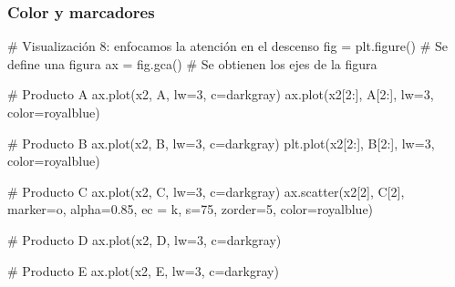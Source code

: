 \documentclass[
  letterpaper,
  DIV=11,
  numbers=noendperiod]{scrreprt}
\newenvironment{Shaded}{\begin{snugshade}}{\end{snugshade}}
\newcommand{\CommentTok}[1]{\textcolor[rgb]{0.37,0.37,0.37}{#1}}
\newcommand{\DecValTok}[1]{\textcolor[rgb]{0.68,0.00,0.00}{#1}}
\newcommand{\FloatTok}[1]{\textcolor[rgb]{0.68,0.00,0.00}{#1}}
\newcommand{\NormalTok}[1]{\textcolor[rgb]{0.00,0.23,0.31}{#1}}
\newcommand{\OperatorTok}[1]{\textcolor[rgb]{0.37,0.37,0.37}{#1}}
\newcommand{\StringTok}[1]{\textcolor[rgb]{0.13,0.47,0.30}{#1}}
\begin{document}
\subsubsection{Color y marcadores}\label{color-y-marcadores}

\begin{Shaded}
\begin{Highlighting}[]
\CommentTok{\# Visualización 8: enfocamos la atención en el descenso}
\NormalTok{fig }\OperatorTok{=}\NormalTok{ plt.figure() }\CommentTok{\# Se define una figura}
\NormalTok{ax }\OperatorTok{=}\NormalTok{ fig.gca()     }\CommentTok{\# Se obtienen los ejes de la figura}

\CommentTok{\# Producto A}
\NormalTok{ax.plot(x2, A, lw}\OperatorTok{=}\DecValTok{3}\NormalTok{, c}\OperatorTok{=}\StringTok{\textquotesingle{}darkgray\textquotesingle{}}\NormalTok{)}
\NormalTok{ax.plot(x2[}\DecValTok{2}\NormalTok{:], A[}\DecValTok{2}\NormalTok{:], lw}\OperatorTok{=}\DecValTok{3}\NormalTok{, color}\OperatorTok{=}\StringTok{\textquotesingle{}royalblue\textquotesingle{}}\NormalTok{)}

\CommentTok{\# Producto B}
\NormalTok{ax.plot(x2, B, lw}\OperatorTok{=}\DecValTok{3}\NormalTok{, c}\OperatorTok{=}\StringTok{\textquotesingle{}darkgray\textquotesingle{}}\NormalTok{)}
\NormalTok{plt.plot(x2[}\DecValTok{2}\NormalTok{:], B[}\DecValTok{2}\NormalTok{:], lw}\OperatorTok{=}\DecValTok{3}\NormalTok{, color}\OperatorTok{=}\StringTok{\textquotesingle{}royalblue\textquotesingle{}}\NormalTok{)}

\CommentTok{\# Producto C}
\NormalTok{ax.plot(x2, C, lw}\OperatorTok{=}\DecValTok{3}\NormalTok{, c}\OperatorTok{=}\StringTok{\textquotesingle{}darkgray\textquotesingle{}}\NormalTok{)}
\NormalTok{ax.scatter(x2[}\DecValTok{2}\NormalTok{], C[}\DecValTok{2}\NormalTok{], marker}\OperatorTok{=}\StringTok{\textquotesingle{}o\textquotesingle{}}\NormalTok{, alpha}\OperatorTok{=}\FloatTok{0.85}\NormalTok{, ec }\OperatorTok{=} \StringTok{\textquotesingle{}k\textquotesingle{}}\NormalTok{, s}\OperatorTok{=}\DecValTok{75}\NormalTok{, zorder}\OperatorTok{=}\DecValTok{5}\NormalTok{, color}\OperatorTok{=}\StringTok{\textquotesingle{}royalblue\textquotesingle{}}\NormalTok{)}

\CommentTok{\# Producto D}
\NormalTok{ax.plot(x2, D, lw}\OperatorTok{=}\DecValTok{3}\NormalTok{, c}\OperatorTok{=}\StringTok{\textquotesingle{}darkgray\textquotesingle{}}\NormalTok{)}

\CommentTok{\# Producto E}
\NormalTok{ax.plot(x2, E, lw}\OperatorTok{=}\DecValTok{3}\NormalTok{, c}\OperatorTok{=}\StringTok{\textquotesingle{}darkgray\textquotesingle{}}\NormalTok{)}


\end{Highlighting}
\end{Shaded}
\end{document}
